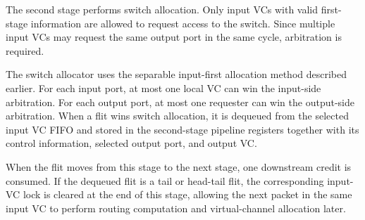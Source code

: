 The second stage performs switch allocation. Only input VCs with valid first-stage information are allowed to request access to the switch. Since multiple input VCs may request the same output port in the same cycle, arbitration is required.

The switch allocator uses the separable input-first allocation method described earlier. For each input port, at most one local VC can win the input-side arbitration. For each output port, at most one requester can win the output-side arbitration. When a flit wins switch allocation, it is dequeued from the selected input VC FIFO and stored in the second-stage pipeline registers together with its control information, selected output port, and output VC.

When the flit moves from this stage to the next stage, one downstream credit is consumed. If the dequeued flit is a tail or head-tail flit, the corresponding input-VC lock is cleared at the end of this stage, allowing the next packet in the same input VC to perform routing computation and virtual-channel allocation later.